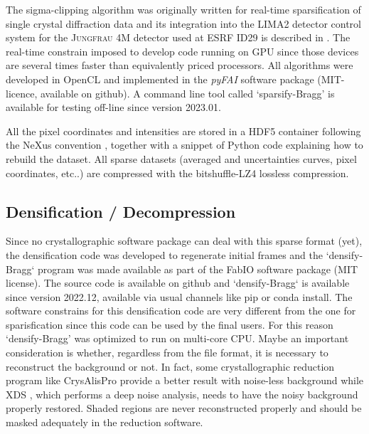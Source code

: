 \documentclass[preprint]{iucr}              %
\begin{document}
The sigma-clipping algorithm was originally written for real-time sparsification of single crystal diffraction data and its integration into the LIMA2 detector control system \cite{lima} for the \textsc{Jungfrau} 4M detector used at ESRF ID29 is described in \cite{sri2021}.
The real-time constrain imposed to develop code running on GPU since those devices are several times
faster than equivalently priced processors.
All algorithms were developed in OpenCL \cite{opencl_khronos} and implemented in the \textit{pyFAI} software package (MIT-licence, available on github).
A command line tool called `sparsify-Bragg' is available for testing off-line since version 2023.01.

All the pixel coordinates and intensities are stored in a HDF5 container \cite{hdf5} following the NeXus  convention \cite{nexus}, together with a snippet of Python code explaining how to rebuild the dataset.
All sparse datasets (averaged and uncertainties curves, pixel coordinates, etc..) are compressed with the bitshuffle-LZ4 \cite{bitshuffle} lossless compression.

\subsection{Densification / Decompression}
Since no crystallographic software package can deal with this sparse format (yet), the densification code was developed to regenerate initial frames and the `densify-Bragg` program was made available as part of the FabIO \cite{fabio} software package (MIT license). 
The source code is available on github and `densify-Bragg` is available since version 2022.12, available via usual channels like pip or conda install. 
The software constrains for this densification code are very different from the one for sparisfication since this code can be used by the final users.
For this reason `densify-Bragg' was optimized to run on multi-core CPU.
Maybe an important consideration is whether, regardless from the file format, it is necessary to reconstruct the background or not. 
In fact, some crystallographic reduction program like CrysAlisPro \cite{crysalis} provide a better result with noise-less background while XDS \cite{xds}, which performs a deep noise analysis, needs to have the noisy background properly restored.
Shaded regions are never reconstructed properly and should be masked adequately in the reduction software.
\end{document}
